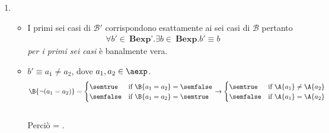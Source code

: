 {\begin{enumerate}[label=(\alph*)]
   =
  \caseFun{\semtrue}
          {( = \semtrue \mbox{ and }  = \semtrue)
           \mbox{ or }
           ( = \semfalse \mbox{ and }  = \semfalse)}
          {\semfalse}
          {( = \semtrue \mbox{ or }  = \semfalse)
           \mbox{ and }
           ( = \semfalse \mbox{ or }  = \semtrue)}
          \\ \\

\item
  \begin{itemize}
    \item I primi sei casi di $\mathcal{B'}$ corrispondono esattamente ai sei
casi di $\mathcal{B}$ pertanto
      \begin{align*}
        \forall b' \in \ \textbf{Bexp'}.\exists b \in 
        \ \textbf{Bexp}.b' \equiv b
      \end{align*}
      \textit{per i primi sei casi} è banalmente vera.

    \item $b' \equiv a_1 \neq a_2$, dove $a_1, a_2 \in \aexp$. \\ 
      \begin{align*}
        \B{\lnot (a_1 = a_2)} =
        \begin{cases}
          \semtrue &
          \mbox{if} \ \B{a_1 = a_2} = \semfalse \\
          \semfalse &
          \mbox{if} \ \B{a_1 = a_2} = \semtrue \\
        \end{cases}
        \rightarrow
        \begin{cases}
          \semtrue &
          \mbox{if} \ \A{a_1} \neq  \A{a_2} \\
          \semfalse &
          \mbox{if} \ \A{a_1} = \A{a_2} \\
        \end{cases}
      \end{align*} \\
      Perciò  = . \\


\end{itemize}
\end{enumerate}}
